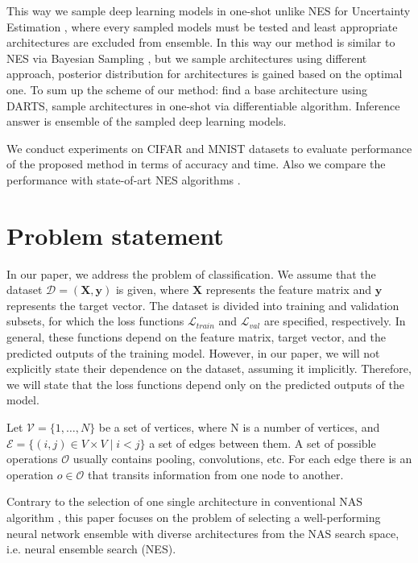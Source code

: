 \documentclass{article}
\begin{document}
This way we sample deep learning models in one-shot unlike NES
for Uncertainty Estimation \citep{nes}, where every sampled models must be tested and least appropriate architectures are excluded from ensemble.
In this way our method is similar to NES via Bayesian Sampling \citep{baysiannes}, but we sample architectures using different approach, posterior distribution for architectures is gained based on the optimal one.
To sum up the scheme of our method: find a base architecture using DARTS, sample architectures in one-shot via differentiable algorithm. Inference answer is ensemble of the sampled deep learning models.

We conduct experiments on CIFAR and MNIST datasets to evaluate performance of the proposed method in terms of accuracy and time. Also we compare the performance with state-of-art NES algorithms \citep{nes, baysiannes}.

\section{Problem statement}

In our paper, we address the problem of classification. We assume that the dataset $\mathcal{D} = (\mathbf{X}, \mathbf{y})$ is given, where $\mathbf{X}$ represents the feature matrix and $\mathbf{y}$ represents the target vector. The dataset is divided into training and validation subsets, for which the loss functions $\mathcal{L}_{train}$ and $\mathcal{L}_{val}$ are specified, respectively. In general, these functions depend on the feature matrix, target vector, and the predicted outputs of the training model. However, in our paper, we will not explicitly state their dependence on the dataset, assuming it implicitly. Therefore, we will state that the loss functions depend only on the predicted outputs of the model.

Let $\mathcal{V} = \{ 1, \ldots, N \}$ be a set of vertices, where N is a number of vertices, and $\mathcal{E} = \{ (i, j) \in V \times V \mid i < j \}$ a set of edges between them. A set of possible operations
$\mathcal{O}$ usually contains pooling, convolutions, etc.
For each edge there is an operation $o \in \mathcal{O}$ that transits information from one node to another.

Contrary to the selection of one single architecture in conventional NAS algorithm \citep{darts, enas, nas}, this paper focuses on the problem of selecting a well-performing neural network ensemble with diverse architectures from the NAS search space, i.e. neural ensemble search (NES).
\end{document}
